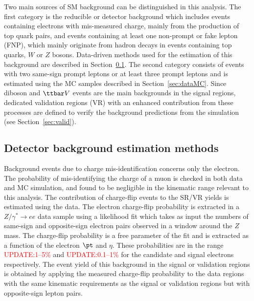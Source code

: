 Two main sources of SM background can be distinguished in this analysis. 
The first category is the reducible or detector background which includes 
events containing electrons with mis-measured charge, mainly from the production of top quark pairs, and events 
containing at least one non-prompt or fake lepton (FNP), which mainly originate from hadron decays in events containing 
top quarks, $W$ or $Z$ bosons. Data-driven methods used for the estimation
of this background are described in Section~\ref{sec:DD_bkg}. The second category consists of events 
with two same-sign prompt leptons or at least three prompt leptons and is 
estimated using the MC samples described in Section~\ref{sec:dataMC}. 
Since diboson and $\ttbar V$ events are the main backgrounds in the signal regions, 
dedicated validation regions (VR) with an enhanced contribution from these processes 
are defined to verify the background predictions from the simulation (see Section~\ref{sec:valid}).


\subsection{Detector background estimation methods} 
\label{sec:DD_bkg}

Background events due to charge mis-identification concerns only the electron. The probability of mis-identifying the 
charge of a muon is checked in both data and MC simulation, and found to be negligible in the kinematic range relevant to this analysis.
The contribution of charge-flip events to the SR/VR yields is estimated using the data. 
The electron charge-flip probability is extracted in a $Z/\gamma^{*}\to ee$ data sample using a likelihood fit 
which takes as input the numbers of same-sign and opposite-sign electron pairs observed in a window around the $Z$ mass. 
The charge-flip probability is a free parameter of the fit and is extracted as a function of the electron $\pt$ and $\eta$. 
These probabilities are in the range \textcolor{red}{UPDATE:1--5\%} and \textcolor{red}{UPDATE:0.1--1\%} for the candidate 
and signal electrons respectively.
The event yield of this background in the signal or validation regions is obtained by applying the measured charge-flip probability 
to the data regions with the same kinematic requirements as the signal or validation regions but with opposite-sign lepton pairs. 

